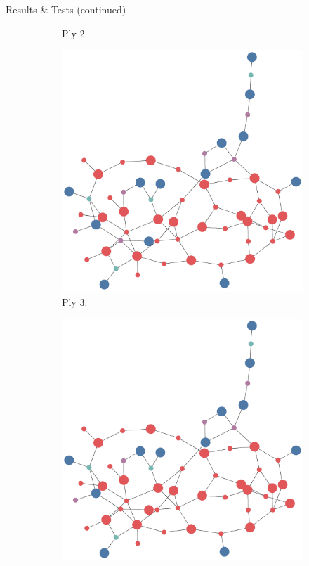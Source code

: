 \documentclass[final]{beamer} %
\begin{document}
\begin{frame}
\begin{columns}
\begin{column}{.3\textwidth}
{\begin{block}{Results \& Tests (continued)}
\begin{figure}[!htb]
\begin{subfigure}[!htb]{0.24\columnwidth}
							\caption{Ply 2.}
						\end{subfigure}
						\begin{subfigure}[!htb]{0.24\columnwidth}
							\centering
							\includegraphics[width=\columnwidth]{figures/knn_backward_think_3.pdf}
							\caption{Ply 3.}
						\end{subfigure}
						\begin{subfigure}[!htb]{0.24\columnwidth}
							\centering
							\includegraphics[width=\columnwidth]{figures/knn_backward_think_4.pdf}

\end{subfigure}
\end{figure}
\end{block}}
\end{column}
\end{columns}
\end{frame}
\end{document}
